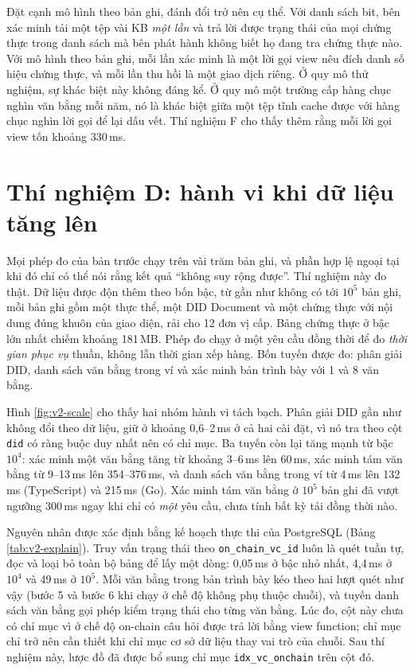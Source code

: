Đặt cạnh mô hình theo bản ghi, đánh đổi trở nên cụ thể. Với danh sách bit, bên xác minh tải một tệp vài KB \emph{một lần} và trả lời được trạng thái của mọi chứng thực trong danh sách mà bên phát hành không biết họ đang tra chứng thực nào. Với mô hình theo bản ghi, mỗi lần xác minh là một lời gọi view nêu đích danh số hiệu chứng thực, và mỗi lần thu hồi là một giao dịch riêng. Ở quy mô thử nghiệm, sự khác biệt này không đáng kể. Ở quy mô một trường cấp hàng chục nghìn văn bằng mỗi năm, nó là khác biệt giữa một tệp tĩnh cache được với hàng chục nghìn lời gọi để lại dấu vết. Thí nghiệm F cho thấy thêm rằng mỗi lời gọi view tốn khoảng 330\,ms.

\section{Thí nghiệm D: hành vi khi dữ liệu tăng lên}
\label{sec:tn-scale}

Mọi phép đo của bản trước chạy trên vài trăm bản ghi, và phần hợp lệ ngoại tại khi đó chỉ có thể nói rằng kết quả ``không suy rộng được''. Thí nghiệm này đo thật. Dữ liệu được độn thêm theo bốn bậc, từ gần như không có tới $10^5$ bản ghi, mỗi bản ghi gồm một thực thể, một DID Document và một chứng thực với nội dung đúng khuôn của giao diện, rải cho 12 đơn vị cấp. Bảng chứng thực ở bậc lớn nhất chiếm khoảng 181\,MB. Phép đo chạy ở một yêu cầu đồng thời để đo \emph{thời gian phục vụ} thuần, không lẫn thời gian xếp hàng. Bốn tuyến được đo: phân giải DID, danh sách văn bằng trong ví và xác minh bản trình bày với 1 và 8 văn bằng.



Hình \ref{fig:v2-scale} cho thấy hai nhóm hành vi tách bạch. Phân giải DID gần như không đổi theo dữ liệu, giữ ở khoảng 0,6--2\,ms ở cả hai cài đặt, vì nó tra theo cột \texttt{did} có ràng buộc duy nhất nên có chỉ mục. Ba tuyến còn lại tăng mạnh từ bậc $10^4$: xác minh một văn bằng tăng từ khoảng 3--6\,ms lên 60\,ms, xác minh tám văn bằng từ 9--13\,ms lên 354--376\,ms, và danh sách văn bằng trong ví từ 4\,ms lên 132\,ms (TypeScript) và 215\,ms (Go). Xác minh tám văn bằng ở $10^5$ bản ghi đã vượt ngưỡng 300\,ms ngay khi chỉ có \emph{một} yêu cầu, chưa tính bất kỳ tải đồng thời nào.



Nguyên nhân được xác định bằng kế hoạch thực thi của PostgreSQL (Bảng \ref{tab:v2-explain}). Truy vấn trạng thái theo \texttt{on\_chain\_vc\_id} luôn là quét tuần tự, đọc và loại bỏ toàn bộ bảng để lấy một dòng: 0,05\,ms ở bậc nhỏ nhất, 4,4\,ms ở $10^4$ và 49\,ms ở $10^5$. Mỗi văn bằng trong bản trình bày kéo theo hai lượt quét như vậy (bước 5 và bước 6 khi chạy ở chế độ không phụ thuộc chuỗi), và tuyến danh sách văn bằng gọi phép kiểm trạng thái cho từng văn bằng. Lúc đo, cột này chưa có chỉ mục vì ở chế độ on-chain câu hỏi được trả lời bằng view function; chỉ mục chỉ trở nên cần thiết khi chỉ mục cơ sở dữ liệu thay vai trò của chuỗi. Sau thí nghiệm này, lược đồ đã được bổ sung chỉ mục \texttt{idx\_vc\_onchain} trên cột đó.

